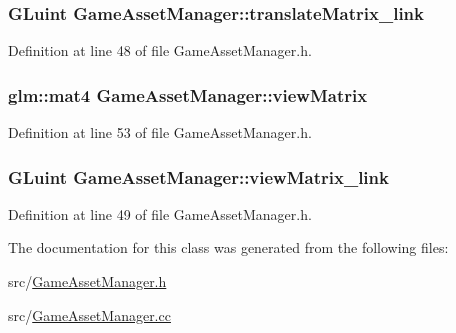 \subsubsection[{translate\+Matrix\+\_\+link}]{\setlength{\rightskip}{0pt plus 5cm}G\+Luint Game\+Asset\+Manager\+::translate\+Matrix\+\_\+link\hspace{0.3cm}{\ttfamily [private]}}\label{class_game_asset_manager_a5e737710573e276ca53c683bc6731a51}


Definition at line 48 of file Game\+Asset\+Manager.\+h.

\hypertarget{class_game_asset_manager_a4e702908c5d7d66e40c676d2c4f7930c}{}
\subsubsection[{view\+Matrix}]{\setlength{\rightskip}{0pt plus 5cm}glm\+::mat4 Game\+Asset\+Manager\+::view\+Matrix\hspace{0.3cm}{\ttfamily [private]}}\label{class_game_asset_manager_a4e702908c5d7d66e40c676d2c4f7930c}


Definition at line 53 of file Game\+Asset\+Manager.\+h.

\hypertarget{class_game_asset_manager_a71322a65c085d1d296e87aaddc4aea15}{}
\subsubsection[{view\+Matrix\+\_\+link}]{\setlength{\rightskip}{0pt plus 5cm}G\+Luint Game\+Asset\+Manager\+::view\+Matrix\+\_\+link\hspace{0.3cm}{\ttfamily [private]}}\label{class_game_asset_manager_a71322a65c085d1d296e87aaddc4aea15}


Definition at line 49 of file Game\+Asset\+Manager.\+h.



The documentation for this class was generated from the following files\+:\begin{DoxyCompactItemize}
\item 
src/\hyperlink{_game_asset_manager_8h}{Game\+Asset\+Manager.\+h}\item 
src/\hyperlink{_game_asset_manager_8cc}{Game\+Asset\+Manager.\+cc}\end{DoxyCompactItemize}
